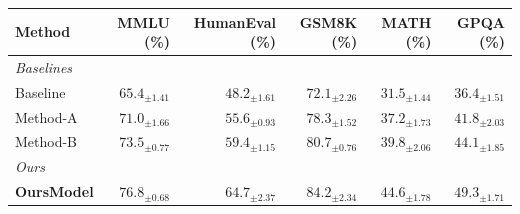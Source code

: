 \documentclass{article}
\begin{document}
\centering
\begin{tabular}{@{}lrrrrr@{}}
\toprule
\textbf{Method} & \textbf{MMLU} (\%) & \textbf{HumanEval} (\%) & \textbf{GSM8K} (\%) & \textbf{MATH} (\%) & \textbf{GPQA} (\%) \\
\midrule
\multicolumn{6}{l}{\textit{Baselines}} \\[1pt]
\quad Baseline & $65.4_{\pm 1.41}$ & $48.2_{\pm 1.61}$ & $72.1_{\pm 2.26}$ & $31.5_{\pm 1.44}$ & $36.4_{\pm 1.51}$ \\
\quad Method-A & $71.0_{\pm 1.66}$ & $55.6_{\pm 0.93}$ & $78.3_{\pm 1.52}$ & $37.2_{\pm 1.73}$ & $41.8_{\pm 2.03}$ \\
\quad Method-B & $73.5_{\pm 0.77}$ & $59.4_{\pm 1.15}$ & $80.7_{\pm 0.76}$ & $39.8_{\pm 2.06}$ & $44.1_{\pm 1.85}$ \\
\midrule
\multicolumn{6}{l}{\textit{Ours}} \\[1pt]
\quad \textbf{OursModel} & \textbf{$76.8_{\pm 0.68}$} & \textbf{$64.7_{\pm 2.37}$} & \textbf{$84.2_{\pm 2.34}$} & \textbf{$44.6_{\pm 1.78}$} & \textbf{$49.3_{\pm 1.71}$} \\
\bottomrule
\end{tabular}
\end{document}
